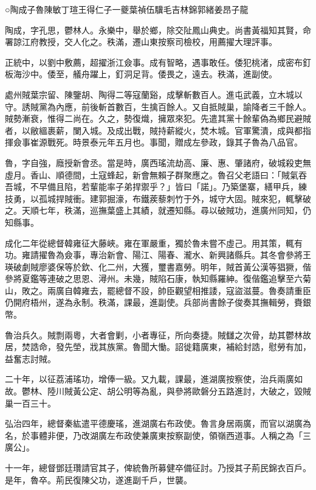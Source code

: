 
\begin{pinyinscope}
○陶成子魯陳敏丁瑄王得仁子一夔葉禎伍驥毛吉林錦郭緒姜昂子龍

陶成，字孔思，鬱林人。永樂中，舉於鄉，除交阯鳳山典史。尚書黃福知其賢，命署諒江府教授，交人化之。秩滿，遷山東按察司檢校，用薦擢大理評事。

正統中，以劉中敷薦，超擢浙江僉事。成有智略，遇事敢任。倭犯桃渚，成密布釘板海沙中。倭至，艤舟躍上，釘洞足背。倭畏之，遠去。秩滿，進副使。

處州賊葉宗留、陳鑒胡、陶得二等寇蘭谿，成擊斬數百人。進屯武義，立木城以守。誘賊黨為內應，前後斬首數百，生擒百餘人。又自抵賊巢，諭降者三千餘人。賊勢漸衰，惟得二尚在。久之，勢復熾，擁眾來犯。先遣其黨十餘輩偽為鄉民避賊者，以敝縕裹薪，闌入城。及成出戰，賊持薪縱火，焚木城。官軍驚潰，成與都指揮僉事崔源戰死。時景泰元年五月也。事聞，贈成左參政，錄其子魯為八品官。

魯，字自強，廕授新會丞。當是時，廣西瑤流劫高、廉、惠、肇諸府，破城殺吏無虛月。香山、順德間，土寇蜂起，新會無賴子群聚應之。魯召父老語曰：「賊氣吞吾城，不早備且陷，若輩能率子弟捍禦乎？」皆曰「諾」。乃築堡寨，繕甲兵，練技勇，以孤城捍賊衝。建郭掘濠，布鐵蒺藜刺竹于外，城守大固。賊來犯，輒擊破之。天順七年，秩滿，巡撫葉盛上其績，就遷知縣。尋以破賊功，進廣州同知，仍知縣事。

成化二年從總督韓雍征大藤峽。雍在軍嚴重，獨於魯未嘗不虛己。用其策，輒有功。雍請擢魯為僉事，專治新會、陽江、陽春、瀧水、新興諸縣兵。其冬會參將王瑛破劇賊廖婆保等於欽、化二州，大獲，璽書嘉勞。明年，賊首黃公漢等猖獗，偕參將夏鑑等連破之思恩、潯州。未幾，賊陷石康，執知縣羅紳。復偕鑑追擊至六菊山，敗之。兩廣自韓雍去，罷總督不設，帥臣觀望相推諉，寇盜滋蔓。魯奏請重臣仍開府梧州，遂為永制。秩滿，課最，進副使。兵部尚書餘子俊奏其撫輯勞，賚銀幣。

魯治兵久。賊剽兩粵，大者會剿，小者專征，所向奏捷。賊讎之次骨，劫其鬱林故居，焚誥命，發先塋，戕其族黨。魯聞大慟。詔徙籍廣東，補給封誥，慰勞有加，益奮志討賊。

二十年，以征荔浦瑤功，增俸一級。又九載，課最，進湖廣按察使，治兵兩廣如故。鬱林、陸川賊黃公定、胡公明等為亂，與參將歐磐分五路進討，大破之，毀賊巢一百三十。

弘治四年，總督秦紘遣平德慶瑤，進湖廣右布政使。魯言身居兩廣，而官以湖廣為名，於事體非便，乃改湖廣左布政使兼廣東按察副使，領嶺西道事。人稱之為「三廣公」。

十一年，總督鄧廷瓚請官其子，俾統魯所募健卒備征討。乃授其子荊民錦衣百戶。是年，魯卒。荊民復陳父功，遂進副千戶，世襲。


\end{pinyinscope}
